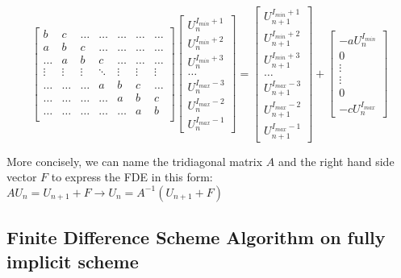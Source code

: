 \[
\begin{bmatrix}
    b & c & \dots & \dots  & \dots & \dots & \dots\\
    a & b & c & \dots  & \dots & \dots & \dots\\
    \dots & a & b & c & \dots & \dots & \dots\\
    \vdots & \vdots & \vdots & \ddots & \vdots & \vdots & \vdots \\
    \dots & \dots & \dots & a & b & c & \dots\\
    \dots & \dots & \dots & \dots & a & b & c\\
    \dots & \dots & \dots & \dots & \dots & a & b\\
\end{bmatrix}
\begin{bmatrix}
    U_{n}^{I_{min}+1}\\
    U_{n}^{I_{min}+2}\\
    U_{n}^{I_{min}+3}\\
    \dots \\
    U_{n}^{I_{max}-3}\\
    U_{n}^{I_{max}-2}\\
    U_{n}^{I_{max}-1}
\end{bmatrix}
=
\begin{bmatrix}
    U_{n+1}^{I_{min}+1}\\
    U_{n+1}^{I_{min}+2}\\
    U_{n+1}^{I_{min}+3}\\
    \dots \\
    U_{n+1}^{I_{max}-3}\\
    U_{n+1}^{I_{max}-2}\\
    U_{n+1}^{I_{max}-1}
\end{bmatrix}
+
\begin{bmatrix}
    -aU_{n}^{I_{min}}\\
    0\\
    \vdots \\
    \vdots \\
    0\\
    -cU_{n}^{I_{max}}
\end{bmatrix}
\]

More concisely, we can name the tridiagonal matrix $A$ and the right hand side vector $F$ to express the FDE in this form: $AU_{n} = U_{n+1} + F \to U_{n} = A^{-1}(U_{n+1} + F)$

\subsection{Finite Difference Scheme Algorithm on fully implicit scheme}

